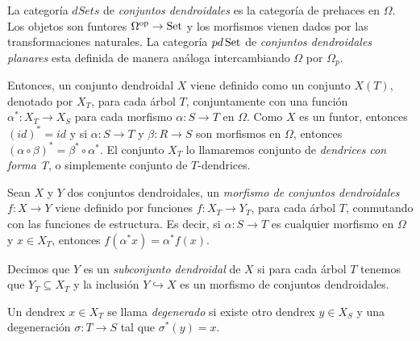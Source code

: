 \documentclass[../main.tex]{subfiles}
\begin{document}
\begin{defi}
    La categor\'ia $dSets$ de \emph{conjuntos dendroidales} es la categor\'ia de prehaces en $\Omega$. Los objetos son funtores $\Omega^{\rm op}\to\mathop{\rm Set}$ y los morfismos vienen dados por las transformaciones naturales. La categor\'ia $pd\mathop{\rm Set}$ de \emph{conjuntos dendroidales planares} esta definida de manera an\'aloga intercambiando $\Omega$ por $\Omega_p$.

    Entonces, un conjunto dendroidal $X$ viene definido como un conjunto $X(T)$, denotado por $X_T$, para cada \'arbol $T$, conjuntamente con una funci\'on $\alpha^{*}\colon X_T \to X_S$ para cada morfismo $\alpha\colon S\to T$ en $\Omega$. Como $X$ es un funtor, entonces $(id)^{*}=id$ y si $\alpha\colon S\to T$ y $\beta\colon R\to S$ son morfismos en $\Omega$, entonces $(\alpha\circ\beta)^{*}=\beta^{*}\circ\alpha^{*}$. El conjunto $X_T$ lo llamaremos conjunto de \emph{dendrices con forma T}, o simplemente conjunto de $T$-dendrices.

    Sean $X$ y $Y$ dos conjuntos dendroidales, un \emph{morfismo de conjuntos dendroidales} $f\colon X \to Y$ viene definido por funciones $f\colon X_T\to Y_T$, para cada \'arbol $T$, conmutando con las funciones de estructura. Es decir, si $\alpha\colon S\to T$ es cualquier morfismo en $\Omega$ y $x\in X_T$, entonces $f(\alpha^{*}x)=\alpha^{*}f(x)$.

    Decimos que $Y$ es un \emph{subconjunto dendroidal} de $X$ si para cada \'arbol $T$ tenemos que $Y_T\subseteq X_T$ y la inclusi\'on $Y \hookrightarrow X$ es un morfismo de conjuntos dendroidales.
\end{defi}
\begin{defi}
    Un dendrex $x\in X_T$ se llama \emph{degenerado} si existe otro dendrex $y\in X_S$ y una degeneraci\'on $\sigma\colon T\to S$ tal que $\sigma^{*}(y)=x$.
\end{defi}
\end{document}
